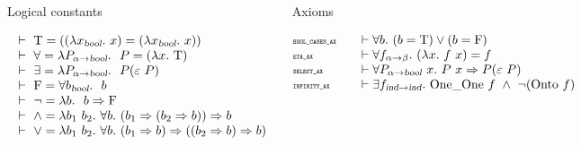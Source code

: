 \begin{frame}[fragile]
\begin{footnotesize}
\begin{columns}
\begin{block}{Logical constants}
\vspace*{-1em}
\begin{tiny}
\[
\begin{array}{l}
\ \vdash\  \mathrm{T}       =  ((\lambda x_{\textsl{bool}}.\ x) =
               (\lambda x_{\textsl{bool}}.\ x))    \\
\ \vdash\  \forall  =  \lambda P_{\alpha{\to}\textsl{bool}}.\ \ P =
                    (\lambda x.\ \mathrm{T} ) \\
\ \vdash\  \exists  =  \lambda P_{\alpha{\to}\textsl{bool}}.\ \
                    P({\varepsilon}\ P) \\
\ \vdash\  \mathrm{F}       =  \forall b_{\textsl{bool}}.\ \ b  \\
\ \vdash\  \neg    =  \lambda b.\ \ b \Rightarrow \mathrm{F} \\
\ \vdash\  {\wedge}  =  \lambda b_1\ b_2.\ \forall b.\ 
                     (b_1\Rightarrow (b_2 \Rightarrow b)) \Rightarrow b \\
\ \vdash\  {\vee}  =  \lambda b_1\ b_2.\ \forall b.\ 
                   (b_1 \Rightarrow b)\Rightarrow ((b_2 \Rightarrow b) \Rightarrow b) \\
\end{array}
\]
\end{tiny}
\end{block}
\begin{block}{Axioms}
\vspace*{-1em}
\begin{tiny}
\[
\begin{array}{@{}l@{\qquad}l}
\mbox{\tiny\tt BOOL\_CASES\_AX}&\vdash \uquant{b} (b = \T ) \vee (b = \F )\\
\mbox{\tiny\tt ETA\_AX}&
\vdash \uquant{f_{\alpha\fun\beta}}(\lquant{x}f\ x) = f\\
\mbox{\tiny\tt SELECT\_AX}&
\vdash \uquant{P_{\alpha\fun\ty{bool}}\ x} P\ x \imp
P({\hilbert}\ P)\\
\mbox{\tiny\tt INFINITY\_AX}&
\vdash \equant{f_{\ind\fun \ind}} \OneOne \ f \conj \neg(\Onto \ f)\\
\end{array}
\]
\end{tiny}
\end{block}
\end{columns}
\end{footnotesize}
\end{frame}
